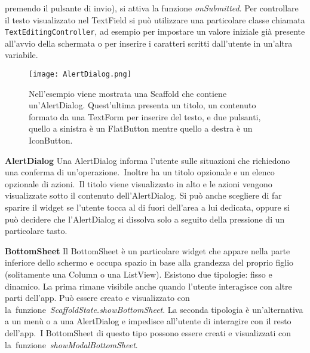 \begin{trivlist}
		premendo il pulsante di invio), si attiva
		la funzione \textit{onSubmitted}. Per controllare il testo visualizzato nel
		TextField si può utilizzare una particolare classe chiamata
		\verb|TextEditingController|, ad esempio per impostare
		un valore iniziale già presente all'avvio della schermata o per inserire
		i caratteri scritti dall'utente in un'altra variabile.
		\begin{figure}
			\centering
			\texttt{[image: AlertDialog.png]}			
			\caption{Nell'esempio viene mostrata una Scaffold che contiene
			un'AlertDialog. Quest'ultima presenta un titolo, un contenuto
			formato da una TextForm per inserire del testo, e due pulsanti,
			quello a sinistra è un FlatButton mentre quello a destra è un IconButton.}
		\end{figure}
		\item \textbf{AlertDialog} \newline
		Una AlertDialog informa l'utente sulle situazioni che richiedono una
		conferma di un'operazione. Inoltre ha un titolo opzionale e un
		elenco opzionale di azioni. Il titolo viene visualizzato in alto e le
		azioni vengono visualizzate sotto il contenuto dell’AlertDialog. Si può
		anche scegliere di far sparire il widget se l'utente tocca al di fuori dell'area a
		lui dedicata, oppure si può decidere che l'AlertDialog si
		dissolva solo a seguito della pressione di un particolare tasto.
		\item \textbf{BottomSheet} \newline
		Il BottomSheet è un particolare widget che appare nella parte inferiore
		dello schermo e occupa spazio in base alla grandezza del proprio figlio
		(solitamente una Column o una ListView). Esistono due tipologie: fisso e
		dinamico. La prima rimane visibile anche quando l'utente interagisce con
		altre parti dell'app. Può essere creato e visualizzato  con
		la funzione \textit{ScaffoldState.showBottomSheet}. La seconda tipologia
		è un'alternativa a un menù o a una AlertDialog e impedisce all'utente di
		interagire con il resto dell'app. I BottomSheet di questo tipo possono
		essere creati e visualizzati con
		la funzione \textit{showModalBottomSheet}.
	\end{trivlist}


